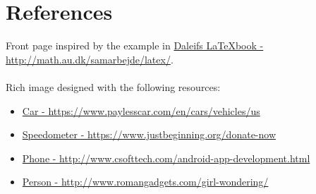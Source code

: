 \documentclass[article, oneside]{memoir}
\begin{document}
\frontmatter



\clearpage

\tableofcontents
\listoffigures

\mainmatter









\backmatter

\chapter{References}
Front page inspired by the example in \href{http://math.au.dk/samarbejde/latex/}{Daleifs \LaTeX book - http://math.au.dk/samarbejde/latex/}.\\
\\
Rich image designed with the following resources:
\begin{itemize}
	\item \href{https://www.paylesscar.com/en/cars/vehicles/us}{Car - https://www.paylesscar.com/en/cars/vehicles/us}
	\item \href{https://www.justbeginning.org/donate-now}{Speedometer - https://www.justbeginning.org/donate-now}
	\item \href{http://www.csofttech.com/android-app-development.html}{Phone - http://www.csofttech.com/android-app-development.html}
	\item \href{http://www.romangadgets.com/girl-wondering/}{Person - http://www.romangadgets.com/girl-wondering/}
\end{itemize}
\end{document}
